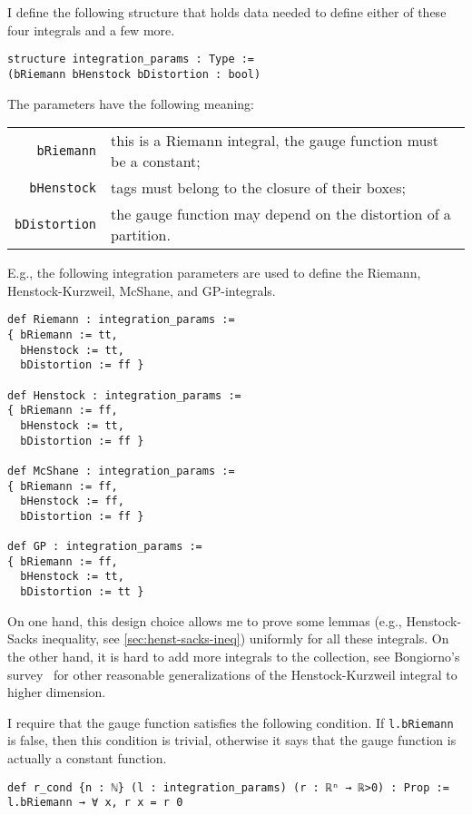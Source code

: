 \documentclass[a4paper, UKenglish,cleveref, autoref, thm-restate]{lipics-v2021}
\begin{document}
I define the following structure that holds data needed to define
either of these four integrals and a few more.

\begin{lstlisting}
structure integration_params : Type :=
(bRiemann bHenstock bDistortion : bool)
\end{lstlisting}

The parameters have the following meaning:

\noindent%
\begin{tabular}{rp{10cm}}
  \lstinline=bRiemann=&this is a Riemann integral, the gauge function must be a constant;\\
  \lstinline=bHenstock=&tags must belong to the closure of their boxes;\\
  \lstinline=bDistortion=&the gauge function may depend on the distortion of a partition.
\end{tabular}

E.g., the following integration parameters are used to define the
Riemann, Henstock-Kurzweil, McShane, and GP-integrals.
\begin{lstlisting}
def Riemann : integration_params :=
{ bRiemann := tt,
  bHenstock := tt,
  bDistortion := ff }

def Henstock : integration_params :=
{ bRiemann := ff,
  bHenstock := tt,
  bDistortion := ff }

def McShane : integration_params :=
{ bRiemann := ff,
  bHenstock := ff,
  bDistortion := ff }

def GP : integration_params :=
{ bRiemann := ff,
  bHenstock := tt,
  bDistortion := tt }
\end{lstlisting}

On one hand, this design choice allows me to prove some lemmas (e.g.,
Henstock-Sacks inequality, see \autoref{sec:henst-sacks-ineq})
uniformly for all these integrals. On the other hand, it is hard to
add more integrals to the collection, see Bongiorno's
survey~\cite{BONGIORNO2002587} for other reasonable generalizations of
the Henstock-Kurzweil integral to higher dimension.

I require that the gauge function satisfies the following
condition. If \lstinline=l.bRiemann= is false, then this condition is
trivial, otherwise it says that the gauge function is actually a
constant function.

\begin{lstlisting}
def r_cond {n : ℕ} (l : integration_params) (r : ℝⁿ → ℝ>0) : Prop :=
l.bRiemann → ∀ x, r x = r 0
\end{lstlisting}
\end{document}
